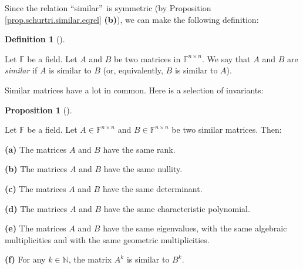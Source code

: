 \documentclass[numbers=enddot,12pt,final,onecolumn,notitlepage]{scrartcl}%
\numberwithin{exer}{subsection}
\theoremstyle{definition}
\newtheorem{prop}[theo]{Proposition}
\newenvironment{proposition}[1][]
{\begin{prop}[#1]\begin{leftbar}}
{\end{leftbar}\end{prop}}
\newtheorem{defi}[theo]{Definition}
\newenvironment{definition}[1][]
{\begin{defi}[#1]\begin{leftbar}}
{\end{leftbar}\end{defi}}
\begin{document}
Since the relation \textquotedblleft similar\textquotedblright\ is symmetric
(by Proposition \ref{prop.schurtri.similar.eqrel} \textbf{(b)}), we can make
the following definition:

\begin{definition}
Let $\mathbb{F}$ be a field. Let $A$ and $B$ be two matrices in $\mathbb{F}%
^{n\times n}$. We say that $A$ and $B$ are \emph{similar} if $A$ is similar to
$B$ (or, equivalently, $B$ is similar to $A$).
\end{definition}

Similar matrices have a lot in common. Here is a selection of invariants:

\begin{proposition}
\label{prop.schurtri.similar.same}Let $\mathbb{F}$ be a field. Let
$A\in\mathbb{F}^{n\times n}$ and $B\in\mathbb{F}^{n\times n}$ be two similar
matrices. Then:

\textbf{(a)} The matrices $A$ and $B$ have the same rank.

\textbf{(b)} The matrices $A$ and $B$ have the same nullity.

\textbf{(c)} The matrices $A$ and $B$ have the same determinant.

\textbf{(d)} The matrices $A$ and $B$ have the same characteristic polynomial.

\textbf{(e)} The matrices $A$ and $B$ have the same eigenvalues, with the same
algebraic multiplicities and with the same geometric multiplicities.

\textbf{(f)} For any $k\in\mathbb{N}$, the matrix $A^{k}$ is similar to
$B^{k}$.
\end{proposition}
\end{document}
